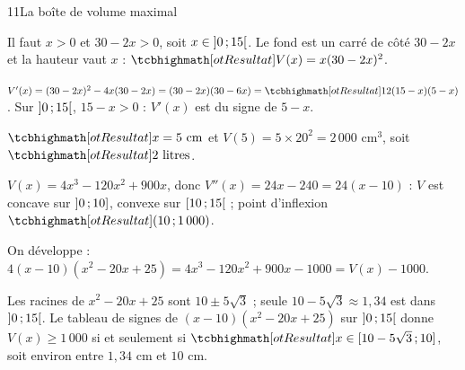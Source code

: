 \begin{corrige}{11}{La boîte de volume maximal}
\begin{questions}
  \item Il faut $x>0$ et $30-2x>0$, soit $x\in\mathopen{]}0\,{;}\,15\mathclose{[}$. Le fond est un carré de côté $30-2x$ et la hauteur vaut $x$ :
    $\res{V(x)=x(30-2x)^{2}}$.
  \item $V'(x)=(30-2x)^{2}-4x(30-2x)=(30-2x)(30-6x)=\res{12(15-x)(5-x)}$. Sur $\mathopen{]}0\,{;}\,15\mathclose{[}$, $15-x>0$ : $V'(x)$ est du signe de $5-x$.
  \item $\res{x=5\text{ cm}}$ et $V(5)=5\times20^{2}=2\,000$ cm$^{3}$, soit $\res{2\text{ litres}}$.
  \item $V(x)=4x^{3}-120x^{2}+900x$, donc $V''(x)=24x-240=24(x-10)$ : $V$ est concave sur $\mathopen{]}0\,{;}\,10\mathclose{]}$, convexe sur
    $\mathopen{[}10\,{;}\,15\mathclose{[}$ ; point d'inflexion $\res{(10\pv1\,000)}$.
  \item \begin{questions}
      \item On développe : $4(x-10)\left(x^{2}-20x+25\right)=4x^{3}-120x^{2}+900x-1000=V(x)-1000$.
      \item Les racines de $x^{2}-20x+25$ sont $10\pm5\sqrt3$ ; seule $10-5\sqrt3\approx1{,}34$ est dans $\mathopen{]}0\,{;}\,15\mathclose{[}$.
        Le tableau de signes de $(x-10)\left(x^{2}-20x+25\right)$ sur $\mathopen{]}0\,{;}\,15\mathclose{[}$ donne $V(x)\geq1\,000$ si et seulement si
        $\res{x\in\intFF{10-5\sqrt3}{10}}$, soit environ entre $1{,}34$ cm et $10$ cm.
    \end{questions}
\end{questions}
\noindent
\begin{minipage}[c]{0.5\linewidth}
\centering
\begin{tableau}
\end{tableau}
\end{minipage}\hfill
\begin{minipage}[c]{0.46\linewidth}
\centering
{}\\[0.5mm]
\end{minipage}
\end{corrige}

